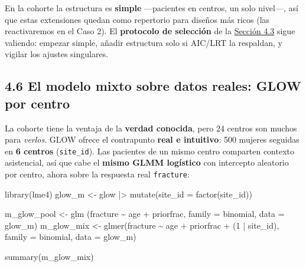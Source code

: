 \documentclass[
  letterpaper,
  DIV=11,
  numbers=noendperiod]{scrartcl}
\newenvironment{Shaded}{\begin{snugshade}}{\end{snugshade}}
\newcommand{\AttributeTok}[1]{\textcolor[rgb]{0.40,0.45,0.13}{#1}}
\newcommand{\DecValTok}[1]{\textcolor[rgb]{0.68,0.00,0.00}{#1}}
\newcommand{\FunctionTok}[1]{\textcolor[rgb]{0.28,0.35,0.67}{#1}}
\newcommand{\NormalTok}[1]{\textcolor[rgb]{0.00,0.23,0.31}{#1}}
\newcommand{\OtherTok}[1]{\textcolor[rgb]{0.00,0.23,0.31}{#1}}
\newcommand{\SpecialCharTok}[1]{\textcolor[rgb]{0.37,0.37,0.37}{#1}}
\begin{document}
En la cohorte la estructura es \textbf{simple} ---pacientes en centros,
un solo nivel---, así que estas extensiones quedan como repertorio para
diseños más ricos (las reactivaremos en el Caso 2). El \textbf{protocolo
de selección} de la \protect\hyperlink{sec-u14-pendiente}{Sección 4.3}
sigue valiendo: empezar simple, añadir estructura solo si AIC/LRT la
respaldan, y vigilar los ajustes singulares.

\hypertarget{sec-u14-glmm-glow}{%
\subsection{4.6 El modelo mixto sobre datos reales: GLOW por
centro}\label{sec-u14-glmm-glow}}

La cohorte tiene la ventaja de la \textbf{verdad conocida}, pero 24
centros son muchos para \emph{verlos}. GLOW ofrece el contrapunto
\textbf{real e intuitivo}: 500 mujeres seguidas en \textbf{6 centros}
(\texttt{site\_id}). Las pacientes de un mismo centro comparten contexto
asistencial, así que cabe el \textbf{mismo GLMM logístico} con
intercepto aleatorio por centro, ahora sobre la respuesta real
\texttt{fracture}:

\begin{Shaded}
\begin{Highlighting}[]
\FunctionTok{library}\NormalTok{(lme4)}
\NormalTok{glow\_m }\OtherTok{\textless{}{-}}\NormalTok{ glow }\SpecialCharTok{|\textgreater{}} \FunctionTok{mutate}\NormalTok{(}\AttributeTok{site\_id =} \FunctionTok{factor}\NormalTok{(site\_id))}

\NormalTok{m\_glow\_pool }\OtherTok{\textless{}{-}} \FunctionTok{glm}\NormalTok{  (fracture }\SpecialCharTok{\textasciitilde{}}\NormalTok{ age }\SpecialCharTok{+}\NormalTok{ priorfrac,                 }\AttributeTok{family =}\NormalTok{ binomial, }\AttributeTok{data =}\NormalTok{ glow\_m)}
\NormalTok{m\_glow\_mix  }\OtherTok{\textless{}{-}} \FunctionTok{glmer}\NormalTok{(fracture }\SpecialCharTok{\textasciitilde{}}\NormalTok{ age }\SpecialCharTok{+}\NormalTok{ priorfrac }\SpecialCharTok{+}\NormalTok{ (}\DecValTok{1} \SpecialCharTok{|}\NormalTok{ site\_id), }\AttributeTok{family =}\NormalTok{ binomial, }\AttributeTok{data =}\NormalTok{ glow\_m)}

\FunctionTok{summary}\NormalTok{(m\_glow\_mix)}
\end{Highlighting}
\end{Shaded}
\end{document}
